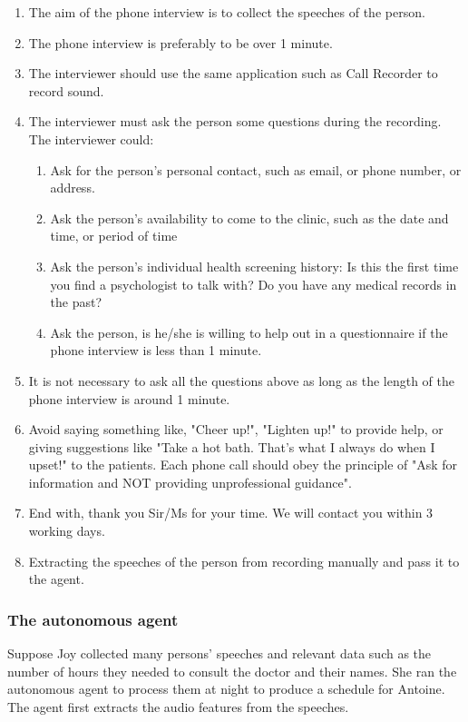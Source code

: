 \documentclass{article}
\begin{document}
    \begin{enumerate}
    		\item The aim of the phone interview is to collect the speeches of the person.
    		\item The phone interview is preferably to be over 1 minute.
		\item The interviewer should use the same application such as Call Recorder to record sound.
		\item The interviewer must ask the person some questions during the recording. The interviewer could: 
          \begin{enumerate}
          	\item Ask for the person's personal contact, such as email, or phone number, or address.
          	\item Ask the person's availability to come to the clinic, such as the date and time, or period of time
          	\item Ask the person's individual health screening history: 
          	Is this the first time you find a psychologist to talk with? Do you have any medical records in the past?
          	\item Ask the person, is he/she is willing to help out in a questionnaire if the phone interview is less than 1 minute.
          \end{enumerate}
        \item It is not necessary to ask all the questions above as long as the length of the phone interview is around 1 minute.
        \item Avoid saying something like, "Cheer up!", "Lighten up!" to provide help, or giving suggestions like 
        		"Take a hot bath. That's what I always do when I upset!" to the patients. 
        		Each phone call should obey the principle of "Ask for information and NOT providing unprofessional guidance". \cite{PCS16}
        \item End with, thank you Sir/Ms for your time. We will contact you within 3 working days.
        \item Extracting the speeches of the person from recording manually and pass it to the agent.
	\end{enumerate}


	\subsubsection{The autonomous agent}
	Suppose Joy collected many persons' speeches and relevant data such as the number of hours they needed to consult the doctor and their names. 
	She ran the autonomous agent to process them at night to produce a schedule for Antoine.
	The agent first extracts the audio features from the speeches.
\end{document}
